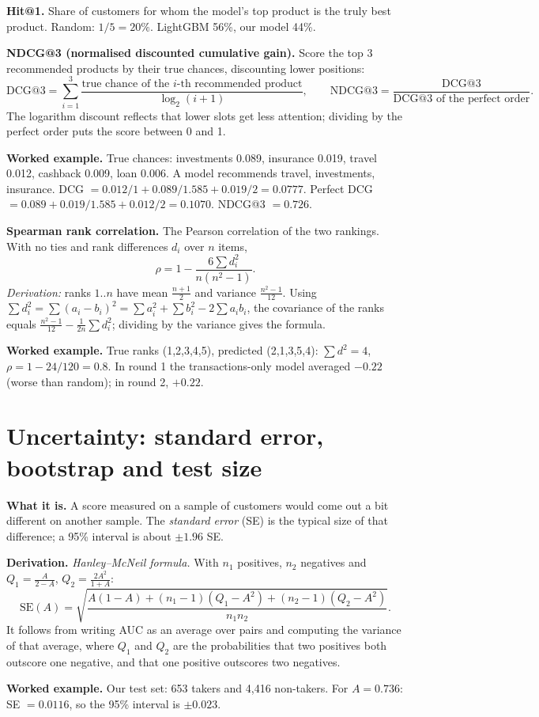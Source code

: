 \documentclass[10pt,a4paper]{article}
\newcommand{\what}[1]{\par\textbf{What it is.} #1}
\newcommand{\deriv}{\par\textbf{Derivation.} }
\newcommand{\ex}{\par\textbf{Worked example.} }
\begin{document}
\textbf{Hit@1.} Share of customers for whom the model's top product is the truly best product. Random: $1/5=20\%$. LightGBM 56\%, our model 44\%.

\textbf{NDCG@3 (normalised discounted cumulative gain).} Score the top 3 recommended products by their true chances, discounting lower positions:
\[\text{DCG@3}=\sum_{i=1}^{3}\frac{\text{true chance of the }i\text{-th recommended product}}{\log_2(i+1)},\qquad\text{NDCG@3}=\frac{\text{DCG@3}}{\text{DCG@3 of the perfect order}}.\]
The logarithm discount reflects that lower slots get less attention; dividing by the perfect order puts the score between 0 and 1.
\ex True chances: investments 0.089, insurance 0.019, travel 0.012, cashback 0.009, loan 0.006. A model recommends travel, investments, insurance. DCG $=0.012/1+0.089/1.585+0.019/2=0.0777$. Perfect DCG $=0.089+0.019/1.585+0.012/2=0.1070$. NDCG@3 $=0.726$.

\textbf{Spearman rank correlation.} The Pearson correlation of the two rankings. With no ties and rank differences $d_i$ over $n$ items,
\[\rho=1-\frac{6\sum d_i^2}{n(n^2-1)}.\]
\emph{Derivation:} ranks $1..n$ have mean $\frac{n+1}{2}$ and variance $\frac{n^2-1}{12}$. Using $\sum d_i^2=\sum(a_i-b_i)^2=\sum a_i^2+\sum b_i^2-2\sum a_ib_i$, the covariance of the ranks equals $\frac{n^2-1}{12}-\frac{1}{2n}\sum d_i^2$; dividing by the variance gives the formula.
\ex True ranks (1,2,3,4,5), predicted (2,1,3,5,4): $\sum d^2=4$, $\rho=1-24/120=0.8$. In round 1 the transactions-only model averaged $-0.22$ (worse than random); in round 2, $+0.22$.

\section{Uncertainty: standard error, bootstrap and test size}\label{sec:ci}
\what{A score measured on a sample of customers would come out a bit different on another sample. The \emph{standard error} (SE) is the typical size of that difference; a 95\% interval is about $\pm1.96$ SE.}
\deriv \emph{Hanley--McNeil formula.} With $n_1$ positives, $n_2$ negatives and $Q_1=\frac{A}{2-A}$, $Q_2=\frac{2A^2}{1+A}$:
\[\text{SE}(A)=\sqrt{\frac{A(1-A)+(n_1-1)(Q_1-A^2)+(n_2-1)(Q_2-A^2)}{n_1n_2}}.\]
It follows from writing AUC as an average over pairs and computing the variance of that average, where $Q_1$ and $Q_2$ are the probabilities that two positives both outscore one negative, and that one positive outscores two negatives.
\ex Our test set: 653 takers and 4,416 non-takers. For $A=0.736$: SE $=0.0116$, so the 95\% interval is $\pm0.023$.
\end{document}
